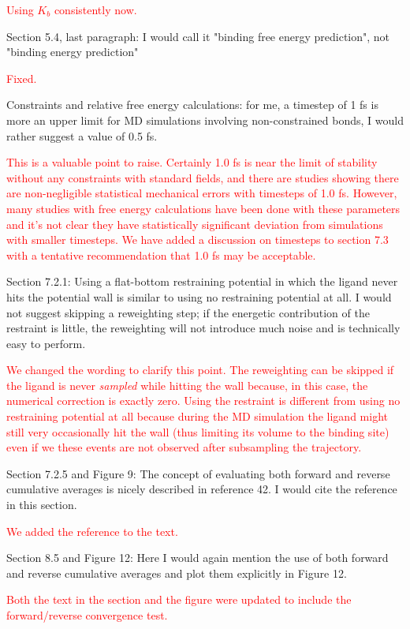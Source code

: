 \documentclass[11pt,a4paper]{letter} %
\begin{document}
\begin{letter}
\textcolor{red}{Using $K_b$ consistently now.}

Section 5.4, last paragraph: I would call it "binding free energy prediction", not "binding energy prediction"

\textcolor{red}{Fixed.}

Constraints and relative free energy calculations: for me, a timestep of 1 fs is more an upper limit for MD simulations involving non-constrained bonds, I would rather suggest a value of 0.5 fs.

\textcolor{red}{ This is a valuable point to raise. Certainly 1.0 fs is near the limit of stability without any constraints with standard fields, and there are studies showing there are non-negligible statistical mechanical errors with timesteps of 1.0 fs. However, many studies with free energy calculations have been done with these parameters and it's not clear they have statistically significant deviation from simulations with smaller timesteps. We have added a discussion on timesteps to section 7.3 with a tentative recommendation that 1.0 fs may be acceptable.}

Section 7.2.1: Using a flat-bottom restraining potential in which the ligand never hits the potential wall is similar to using no restraining potential at all. I would not suggest skipping a reweighting step; if the energetic contribution of the restraint is little, the reweighting will not introduce much noise and is technically easy to perform.

\textcolor{red}{We changed the wording to clarify this point. The reweighting can be skipped if the ligand is never \textit{sampled} while hitting the wall because, in this case, the numerical correction is exactly zero. Using the restraint is different from using no restraining potential at all because during the MD simulation the ligand might still very occasionally hit the wall (thus limiting its volume to the binding site) even if we these events are not observed after subsampling the trajectory.}

Section 7.2.5 and Figure 9: The concept of evaluating both forward and reverse cumulative averages is nicely described in reference 42. I would cite the reference in this section.

\textcolor{red}{We added the reference to the text.}

Section 8.5 and Figure 12: Here I would again mention the use of both forward and reverse cumulative averages and plot them explicitly in Figure 12.

\textcolor{red}{Both the text in the section and the figure were updated to include the forward/reverse convergence test.}


\end{letter}
\end{document}
